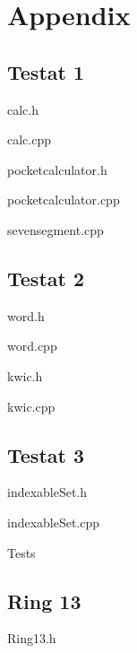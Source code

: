\section{Appendix}

\subsection{Testat 1}
calc.h

calc.cpp

pocketcalculator.h

pocketcalculator.cpp

sevensegment.cpp


\subsection{Testat 2}
word.h

word.cpp


kwic.h

kwic.cpp


\subsection{Testat 3}
indexableSet.h

indexableSet.cpp

Tests


\pagebreak

\subsection{Ring 13}
Ring13.h
